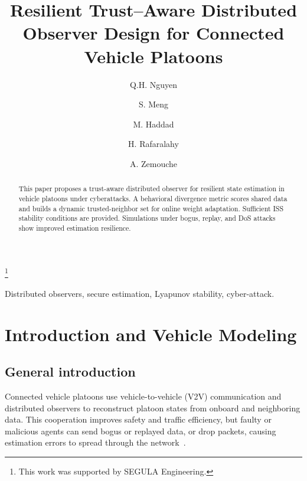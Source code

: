 \documentclass{ifacconf}
\begin{document}
\begin{frontmatter}

\title{Resilient Trust--Aware Distributed Observer Design for Connected Vehicle Platoons
}  

\thanks[footnoteinfo]{This work was supported by SEGULA Engineering.}

\author[First]{Q.H. Nguyen} 
\author[First]{S. Meng} 
\author[Second]{M. Haddad}
\author[First]{H. Rafaralahy}
\author[First]{A. Zemouche}

\address[First]{Universit\'e de Lorraine, CNRS, CRAN, F-57000 Metz (e-mail: quang-huy.nguyen@univ-lorraine.fr).}
\address[Second]{SEGULA Engineering, 19 rue d'Arras, 92000 Nanterre, France (e-mail: madjid.haddad@segula.fr)}

\begin{abstract}                %
This paper proposes a trust-aware distributed observer for resilient state estimation in vehicle platoons under cyberattacks. 
A behavioral divergence metric scores shared data and builds a dynamic trusted-neighbor set for online weight adaptation. 
Sufficient ISS stability conditions are provided. 
Simulations under bogus, replay, and DoS attacks show improved estimation resilience.
\end{abstract}

\begin{keyword}
Distributed observers, secure estimation, Lyapunov stability, cyber-attack.
\end{keyword}

\end{frontmatter}



\section{Introduction and Vehicle Modeling}\label{sec_introduction}
\subsection{General introduction}
\vspace*{-0.3pt}
Connected vehicle platoons use vehicle-to-vehicle (V2V) communication and distributed observers to reconstruct platoon states from onboard and neighboring data. This cooperation improves safety and traffic efficiency, but faulty or malicious agents can send bogus or replayed data, or drop packets, causing estimation errors to spread through the network~\citep{Ali_book,Shengya_HG}.
\end{document}
